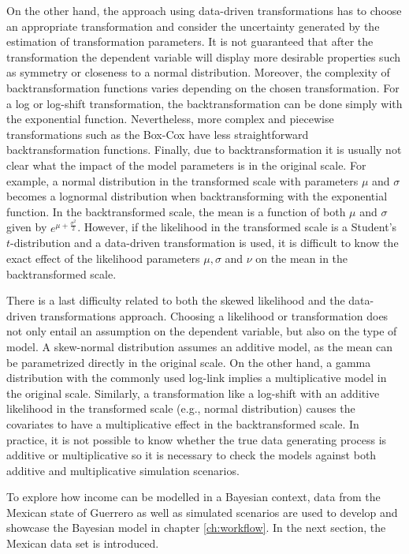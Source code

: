 On the other hand, the approach using data-driven transformations has to choose an appropriate transformation and consider the uncertainty generated by the estimation of transformation parameters.
It is not guaranteed that after the transformation the dependent variable will display more desirable properties such as symmetry or closeness to a normal distribution.
Moreover, the complexity of backtransformation functions varies depending on the chosen transformation.
For a log or log-shift transformation, the backtransformation can be done simply with the exponential function.
Nevertheless, more complex and piecewise transformations such as the Box-Cox have less straightforward backtransformation functions.
Finally, due to backtransformation it is usually not clear what the impact of the model parameters is in the original scale.
For example, a normal distribution in the transformed scale with parameters $\mu$ and $\sigma$ becomes a lognormal distribution when backtransforming with the exponential function.
In the backtransformed scale, the mean is a function of both $\mu$ and $\sigma$ given by $e^{\mu + \frac{\sigma^2}{2}}$.
However, if the likelihood in the transformed scale is a Student's $t$-distribution and a data-driven transformation is used, it is difficult to know the exact effect of the likelihood parameters $\mu, \sigma$ and $\nu$ on the mean in the backtransformed scale.

There is a last difficulty related to both the skewed likelihood and the data-driven transformations approach.
Choosing a likelihood or transformation does not only entail an assumption on the dependent variable, but also on the type of model.
A skew-normal distribution assumes an additive model, as the mean can be parametrized directly in the original scale. On the other hand, a gamma distribution with the commonly used log-link implies a multiplicative model in the original scale.
Similarly, a transformation like a log-shift with an additive likelihood in the transformed scale (e.g., normal distribution) causes the covariates to have a multiplicative effect in the backtransformed scale.
In practice, it is not possible to know whether the true data generating process is additive or multiplicative so it is necessary to check the models against both additive and multiplicative simulation scenarios.

To explore how income can be modelled in a Bayesian context, data from the Mexican state of Guerrero as well as simulated scenarios are used to develop and showcase the Bayesian model in chapter \ref{ch:workflow}.
In the next section, the Mexican data set is introduced.

